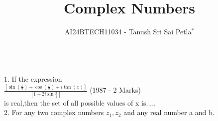 \documentclass[journal,12pt,twocolumn]{IEEEtran}
\theoremstyle{remark}
\begin{document}

\vspace{3cm}

\title{Complex Numbers}
\author{AI24BTECH11034 - Tanush Sri Sai Petla$^{*}$%
}

\\
1. If the expression    \\        

$\frac{[\sin(\frac{x}{2}) + \cos(\frac{x}{2}) + i\tan(x)]}{[1+2i\sin\frac{x}{2}]}$   \hfill(1987 - 2 Marks)\\
is real,then the set of all possible values of x is.....\\
2.  For any two complex numbers $z_1,z_2$ and any real number a and b.
\end{document}
